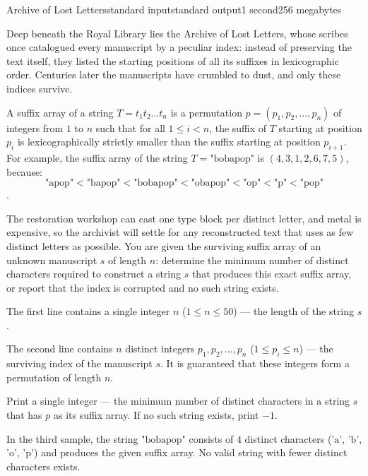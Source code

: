 \begin{problem}{Archive of Lost Letters}{standard input}{standard output}{1 second}{256 megabytes}

Deep beneath the Royal Library lies the Archive of Lost Letters, whose scribes once catalogued every manuscript by a peculiar index: instead of preserving the text itself, they listed the starting positions of all its suffixes in lexicographic order. Centuries later the manuscripts have crumbled to dust, and only these indices survive.

A suffix array of a string $T = t_1 t_2 \dots t_n$ is a permutation $p = (p_1, p_2, \dots, p_n)$ of integers from $1$ to $n$ such that for all $1 \le i < n$, the suffix of $T$ starting at position $p_i$ is lexicographically strictly smaller than the suffix starting at position $p_{i+1}$.
For example, the suffix array of the string $T = \text{"bobapop"}$ is $(4, 3, 1, 2, 6, 7, 5)$, because:$$\text{"apop"} < \text{"bapop"} < \text{"bobapop"} < \text{"obapop"} < \text{"op"} < \text{"p"} < \text{"pop"}$$.

The restoration workshop can cast one type block per distinct letter, and metal is expensive, so the archivist will settle for any reconstructed text that uses as few distinct letters as possible. You are given the surviving suffix array of an unknown manuscript $s$ of length $n$: determine the minimum number of distinct characters required to construct a string $s$ that produces this exact suffix array, or report that the index is corrupted and no such string exists.


\InputFile
The first line contains a single integer $n$ ($1 \le n \le 50$) --- the length of the string $s$.

The second line contains $n$ distinct integers $p_1, p_2, \dots, p_n$ ($1 \le p_i \le n$) --- the surviving index of the manuscript $s$. It is guaranteed that these integers form a permutation of length $n$.


\OutputFile
Print a single integer --- the minimum number of distinct characters in a string $s$ that has $p$ as its suffix array. If no such string exists, print $-1$.


\Examples

\begin{example}
%
%
%
\end{example}

\Note
In the third sample, the string $\text{"bobapop"}$ consists of $4$ distinct characters ($\text{'a'}$, $\text{'b'}$, $\text{'o'}$, $\text{'p'}$) and produces the given suffix array. 
No valid string with fewer distinct characters exists.


\end{problem}


